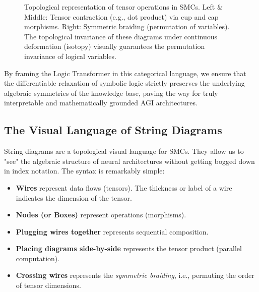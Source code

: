 \documentclass[runningheads]{llncs}
\begin{document}
\begin{figure}[h]
	\centering
	\caption{Topological representation of tensor operations in SMCs. Left \& Middle: Tensor contraction (e.g., dot product) via cup and cap morphisms. Right: Symmetric braiding (permutation of variables). The topological invariance of these diagrams under continuous deformation (isotopy) visually guarantees the permutation invariance of logical variables.}
	\label{fig:cup-cap-contraction}
\end{figure}

By framing the Logic Transformer in this categorical language, we ensure that the differentiable relaxation of symbolic logic strictly preserves the underlying algebraic symmetries of the knowledge base, paving the way for truly interpretable and mathematically grounded AGI architectures.

\subsection{The Visual Language of String Diagrams}
String diagrams are a topological visual language for SMCs. They allow us to "see" the algebraic structure of neural architectures without getting bogged down in index notation. The syntax is remarkably simple:
\begin{itemize}
	\item \textbf{Wires} represent data flows (tensors). The thickness or label of a wire indicates the dimension of the tensor.
	\item \textbf{Nodes (or Boxes)} represent operations (morphisms).
	\item \textbf{Plugging wires together} represents sequential composition.
	\item \textbf{Placing diagrams side-by-side} represents the tensor product (parallel computation).
	\item \textbf{Crossing wires} represents the \textit{symmetric braiding}, i.e., permuting the order of tensor dimensions.
\end{itemize}
\end{document}

